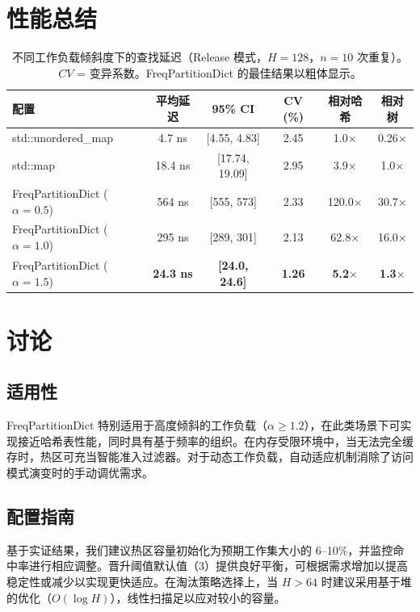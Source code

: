 \documentclass[11pt,a4paper]{article}
\begin{document}
\section{性能总结}

\begin{table}[H]
\centering
\caption{不同工作负载倾斜度下的查找延迟（Release 模式，$H = 128$，$n = 10$ 次重复）。$CV$ = 变异系数。FreqPartitionDict 的最佳结果以粗体显示。}
\label{tab:performance}
\begin{tabular}{lccccc}
\toprule
\textbf{配置} & \textbf{平均延迟} & \textbf{95\% CI} & \textbf{CV (\%)} & \textbf{相对哈希} & \textbf{相对树} \\
\midrule
std::unordered\_map & 4.7 ns & [4.55, 4.83] & 2.45 & 1.0$\times$ & 0.26$\times$ \\
std::map & 18.4 ns & [17.74, 19.09] & 2.95 & 3.9$\times$ & 1.0$\times$ \\
FreqPartitionDict ($\alpha = 0.5$) & 564 ns & [555, 573] & 2.33 & 120.0$\times$ & 30.7$\times$ \\
FreqPartitionDict ($\alpha = 1.0$) & 295 ns & [289, 301] & 2.13 & 62.8$\times$ & 16.0$\times$ \\
FreqPartitionDict ($\alpha = 1.5$) & \textbf{24.3 ns} & \textbf{[24.0, 24.6]} & \textbf{1.26} & \textbf{5.2$\times$} & \textbf{1.3$\times$} \\
\bottomrule
\end{tabular}
\end{table}

\section{讨论}

\subsection{适用性}

FreqPartitionDict 特别适用于高度倾斜的工作负载（$\alpha \geq 1.2$），在此类场景下可实现接近哈希表性能，同时具有基于频率的组织。在内存受限环境中，当无法完全缓存时，热区可充当智能准入过滤器。对于动态工作负载，自动适应机制消除了访问模式演变时的手动调优需求。

\subsection{配置指南}

基于实证结果，我们建议热区容量初始化为预期工作集大小的 6--10\%，并监控命中率进行相应调整。晋升阈值默认值（3）提供良好平衡，可根据需求增加以提高稳定性或减少以实现更快适应。在淘汰策略选择上，当 $H > 64$ 时建议采用基于堆的优化（$O(\log H)$），线性扫描足以应对较小的容量。
\end{document}
